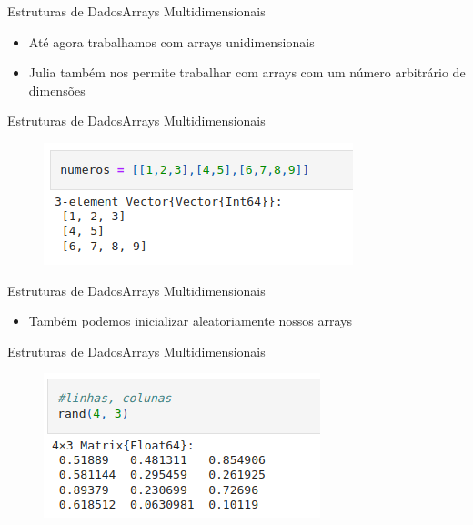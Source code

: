 \documentclass{beamer}
\begin{document}
\begin{frame}{Estruturas de Dados}{Arrays Multidimensionais}
    \begin{itemize}
        \item Até agora trabalhamos com arrays unidimensionais
        \item Julia também nos permite trabalhar com arrays com um número arbitrário de dimensões
    \end{itemize}
\end{frame}

\begin{frame}{Estruturas de Dados}{Arrays Multidimensionais}
    \begin{figure}
        \centering
        \includegraphics[scale=0.5]{imagens/array09.png}
        \label{fig:my_label}
    \end{figure}
\end{frame}

\begin{frame}{Estruturas de Dados}{Arrays Multidimensionais}
    \begin{itemize}
        \item Também podemos inicializar aleatoriamente nossos arrays
    \end{itemize}
\end{frame}


\begin{frame}{Estruturas de Dados}{Arrays Multidimensionais}
    \begin{figure}
        \centering
        \includegraphics[scale=0.5]{imagens/array10.png}
        \label{fig:my_label}
    \end{figure}
\end{frame}
\end{document}
